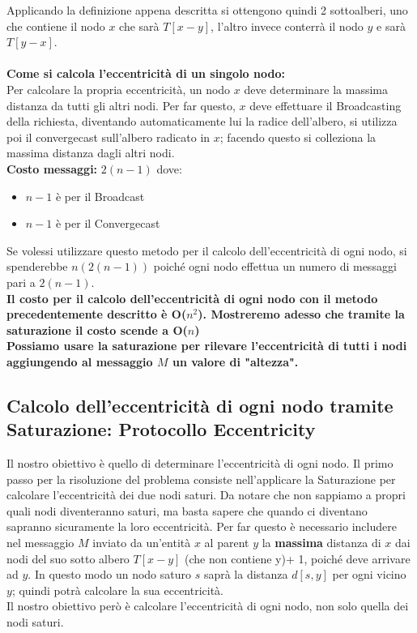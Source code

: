 Applicando la definizione appena descritta si ottengono quindi 2 sottoalberi,
uno che contiene il nodo $x$ che sarà $T[x - y]$, l'altro invece conterrà il
nodo $y$ e sarà $T[y - x]$. \\\\
\textbf{Come si calcola l'eccentricità di un singolo nodo:}\\
Per calcolare la propria eccentricità, un nodo $x$ deve determinare la massima
distanza da tutti gli altri nodi. Per far questo, $x$ deve effettuare il
Broadcasting della richiesta, diventando automaticamente lui la radice
dell'albero, si utilizza poi il convergecast sull'albero radicato in $x$;
facendo questo si colleziona la massima distanza dagli altri nodi.\\
\textbf{Costo messaggi:} $2(n-1)$ dove:
\begin{itemize}
    \item $n-1$ è  per il Broadcast
    \item $n-1$ è per il Convergecast
\end{itemize}
Se volessi utilizzare questo metodo per il calcolo dell'eccentricità di ogni
nodo, si spenderebbe $n(2(n-1))$ poiché ogni nodo effettua un numero di messaggi
pari a $2(n-1)$.\\

\textbf{Il costo per il calcolo dell'eccentricità di ogni nodo con il metodo
    precedentemente descritto è O($n^2$). Mostreremo adesso che tramite la
    saturazione il costo scende a O($n$)}\\

\textbf{Possiamo usare la saturazione per rilevare l'eccentricità di tutti i
    nodi aggiungendo al messaggio $M$ un valore di "altezza".}

\subsection{Calcolo dell'eccentricità di ogni nodo tramite Saturazione: Protocollo Eccentricity}
Il nostro obiettivo è quello di determinare l'eccentricità di ogni nodo. Il
primo passo per la risoluzione del problema consiste nell'applicare la
Saturazione per calcolare l'eccentricità dei due nodi saturi. Da notare che non
sappiamo a propri quali nodi diventeranno saturi, ma basta sapere che quando ci
diventano sapranno sicuramente la loro eccentricità. Per far questo è necessario
includere nel messaggio $M$ inviato da un'entità $x$ al parent $y$ la
\textbf{massima} distanza di $x$ dai nodi del suo sotto albero $T[x-y]$ (che non
contiene y)+ 1, poiché deve arrivare ad $y$. In questo modo un nodo saturo $s$
saprà la distanza $d[s,y]$ per ogni vicino $y$; quindi potrà calcolare la sua
eccentricità. \\
Il nostro obiettivo però è calcolare l'eccentricità di ogni nodo, non solo
quella dei nodi saturi.\\

